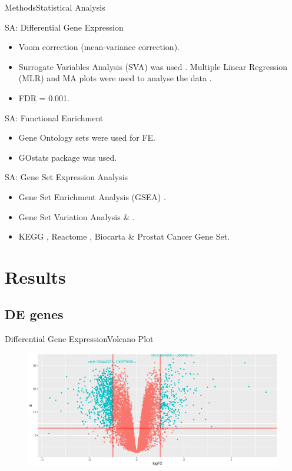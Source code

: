 \documentclass{beamer}
\begin{document}
\begin{frame}{Methods}{Statistical Analysis}
	\begin{block}{SA: Differential Gene Expression}
		\begin{itemize}
			\item Voom correction (mean-variance correction).
			\item Surrogate Variables Analysis (SVA) was used \cite{leek2007capturing} \cite{svamanual}. Multiple Linear Regression (MLR)  and MA plots were used to analyse the data \cite{limma}.
			\item FDR = 0.001.
		\end{itemize}
	\end{block}
	\begin{block}{SA: Functional Enrichment}
		\begin{itemize}
			\item Gene Ontology sets were used for FE.
			\item GOstats package \cite{GOstats} was used.
		\end{itemize}
	\end{block}
	\begin{block}{SA: Gene Set Expression Analysis}
		\begin{itemize}
			\item Gene Set Enrichment Analysis (GSEA) \cite{GSEABase}.
			\item Gene Set Variation Analysis \cite{GSVA} \& \cite{GSVAdata}.
			\item KEGG \cite{kanehisa2016kegg}, Reactome \cite{fabregat2016reactome}, Biocarta \cite{nishimura2001biocarta} \& Prostat Cancer Gene Set.
		\end{itemize}
	\end{block}	
\end{frame}


\section{Results}


\subsection{DE genes}

\begin{frame}{Differential Gene Expression}{Volcano Plot}

   \begin{figure}
        \includegraphics[width=1\textwidth]{Volcano.eps}
    \end{figure}

\end{frame}
\end{document}
